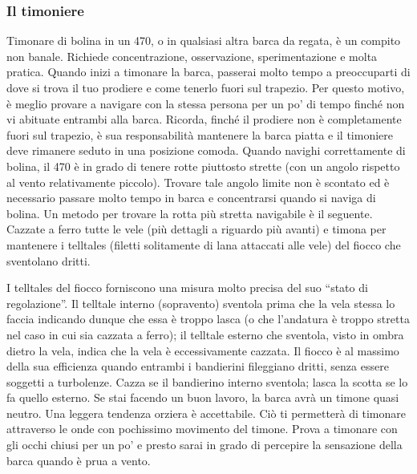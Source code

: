 \subsubsection{Il timoniere}
\label{subsubsec:IlTimoniere}
Timonare di bolina in un 470, o in qualsiasi altra barca da regata, è un compito
non banale. Richiede concentrazione, osservazione, sperimentazione e molta
pratica. Quando inizi a timonare la barca, passerai molto tempo a preoccuparti
di dove si trova il tuo prodiere e come tenerlo fuori sul trapezio. Per questo
motivo, è meglio provare a navigare con la stessa persona per un po' di tempo
finché non vi abituate entrambi alla barca. Ricorda, finché il prodiere non è
completamente fuori sul trapezio, è sua responsabilità mantenere la barca piatta
e il timoniere deve rimanere seduto in una posizione comoda. Quando navighi
correttamente di bolina, il 470 è in grado di tenere rotte piuttosto strette
(con un angolo rispetto al vento relativamente piccolo). Trovare tale angolo
limite non è scontato ed è necessario passare molto tempo in barca e
concentrarsi quando si naviga di bolina. Un metodo per trovare la rotta più
stretta navigabile è il seguente. Cazzate a ferro tutte le vele (più dettagli a
riguardo più avanti) e timona per mantenere i telltales (filetti solitamente di
lana attaccati alle vele) del fiocco che sventolano dritti.

I telltales del fiocco forniscono una misura molto precisa del suo ``stato di
regolazione''. Il telltale interno (sopravento) sventola prima che la vela
stessa lo faccia indicando dunque che essa è troppo lasca (o che l'andatura è
troppo stretta nel caso in cui sia cazzata a ferro); il telltale esterno che
sventola, visto in ombra dietro la vela, indica che la vela è eccessivamente
cazzata. Il fiocco è al massimo della sua efficienza quando entrambi i
bandierini fileggiano dritti, senza essere soggetti a turbolenze. Cazza se il
bandierino interno sventola; lasca la scotta se lo fa quello esterno. Se stai
facendo un buon lavoro, la barca avrà un timone quasi neutro. Una leggera
tendenza orziera è accettabile. Ciò ti permetterà di timonare attraverso le onde
con pochissimo movimento del timone. Prova a timonare con gli occhi chiusi per
un po' e presto sarai in grado di percepire la sensazione della barca quando è
prua a vento.

